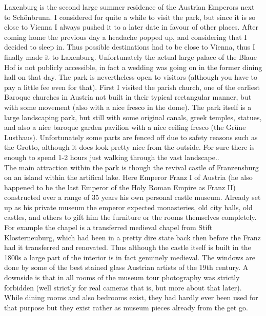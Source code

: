 {Laxenburg is the second large summer residence of the Austrian Emperors next to Sch\"onbrunn. I considered for quite a while to visit the park, but since it is so close to Vienna I always pushed it to a later date in favour of other places. After coming home the previous day a headache popped up, and considering that I decided to sleep in. Thus possible destinations had to be close to Vienna, thus I finally made it to Laxenburg. Unfortunately the actual large palace of the Blaue Hof is not publicly accessible, in fact a wedding was going on in the former dining hall on that day. The park is nevertheless open to visitors (although you have to pay a little fee even for that). First I visited the parish church, one of the earliest Baroque churches in Austria not built in their typical rectangular manner, but with some movement (also with a nice fresco in the dome). The park itself is a large landscaping park, but still with some original canals, greek temples, statues, and also a nice baroque garden pavilion with a nice ceiling fresco (the Gr\"une Lusthaus). Unfortunately some parts are fenced off due to safety reasons such as the Grotto, although it does look pretty nice from the outside. For sure there is enough to spend 1-2 hours just walking through the vast landscape..\\
 The main attraction within the park is though the revival castle of Franzensburg on an island within the artifical lake. Here Emperor Franz I of Austria (he also happened to be the last Emperor of the Holy Roman Empire as Franz II) constructed over a range of 35 years his own personal castle museum. Already set up as his private museum the emperor expected monasteries, old city halls, old castles, and others to gift him the furniture or the rooms themselves completely. For example the chapel is a transferred medieval chapel from Stift Klosterneuburg, which had been in a pretty dire state back then before the Franz had it transferred and renovated. Thus although the castle itself is built in the 1800s a large part of the interior is in fact genuinely medieval. The windows are done by some of the best stained glass Austrian artists of the 19th century. A downside is that in all rooms of the museum tour photography was strictly forbidden (well strictly for real cameras that is, but more about that later). While dining rooms and also bedrooms exist, they had hardly ever been used for that purpose but they exist rather as museum pieces already from the get go.\\
}
